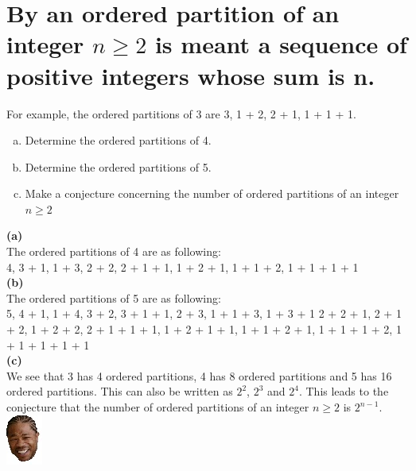 \section{By an ordered partition of an integer $n\geq 2$ is meant a sequence of positive integers whose sum is n.}
For example, the ordered partitions of 3 are 3, 1 + 2, 2 + 1, 1 + 1 + 1.
\begin{enumerate}[(a)]
\item Determine the ordered partitions of 4.
\item Determine the ordered partitions of 5.
\item Make a conjecture concerning the number of ordered partitions of an integer $n\geq 2$
\end{enumerate}
\textbf{\Large(a)}\\
The ordered partitions of 4 are as following: \\
4,
 3 + 1, 1 + 3,
  2 + 2, 2 + 1 + 1, 1 + 2 + 1, 1 + 1 + 2,
   1 + 1 + 1 + 1\\
\textbf{\Large(b)}\\
The ordered partitions of 5 are as following: \\
5,
 4 + 1, 1 + 4,
  3 + 2, 3 + 1 + 1, 2 + 3, 1 + 1 + 3, 1 + 3 + 1
   2 + 2 + 1, 2 + 1 + 2, 1 + 2 + 2, 2 + 1 + 1 + 1, 1 + 2 + 1 + 1, 1 + 1 + 2 + 1, 1 + 1 + 1 + 2,
    1 + 1 + 1 + 1 + 1\\
\textbf{\Large(c)}\\
We see that 3 has 4 ordered partitions, 4 has 8 ordered partitions and 5 has 16 ordered partitions. This can also be written as $2^2$, $2^3$ and $2^4$. This leads to the conjecture that the number of ordered partitions of an integer $n\geq 2$ is $2^{n-1}$.\includegraphics[scale=0.70]{billeder/xzibit}


